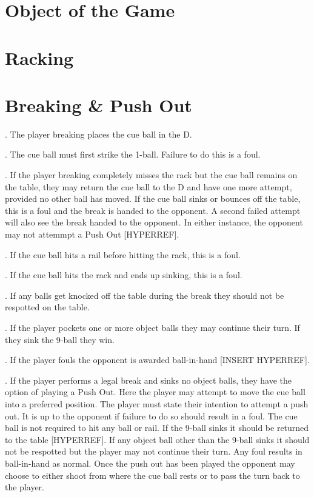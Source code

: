 



\section{Object of the Game} \label{9ball:description}

\section{Racking} \label{9ball:racking}

\section{Breaking \& Push Out} \label{9ball:breaking}
\ex. The player breaking places the cue ball in the D.\par
\ex. The cue ball must first strike the 1-ball. Failure to do this is a foul.\par
\ex. If the player breaking completely misses the rack but the cue ball remains on the table, they may return the cue ball to the D and have one more attempt, provided no other ball has moved. If the cue ball sinks or bounces off the table, this is a foul and the break is handed to the opponent. A second failed attempt will also see the break handed to the opponent. In either instance, the opponent may not attemmpt a Push Out [HYPERREF].\par
\ex. If the cue ball hits a rail before hitting the rack, this is a foul.\par
\ex. If the cue ball hits the rack and ends up sinking, this is a foul.\par
\ex. If any balls get knocked off the table during the break they should not be respotted on the table.\par
\ex. If the player pockets one or more object balls they may continue their turn. If they sink the 9-ball they win.\par
\ex. If the player fouls the opponent is awarded ball-in-hand [INSERT HYPERREF].\par
\ex. If the player performs a legal break and sinks no object balls, they have the option of playing a Push Out.\itemspace 
{}Here the player may attempt to move the cue ball into a preferred position.\itemspace
{}The player must state their intention to attempt a push out. It is up to the opponent if failure to do so should result in a foul.\itemspace
{}The cue ball is not required to hit any ball or rail.\itemspace
{}If the 9-ball sinks it should be returned to the table [HYPERREF].\itemspace
{}If any object ball other than the 9-ball sinks it should not be respotted but the player may not continue their turn.\itemspace
{}Any foul results in ball-in-hand as normal.\itemspace
{}Once the push out has been played the opponent may choose to either shoot from where the cue ball rests or to pass the turn back to the player.
\par


